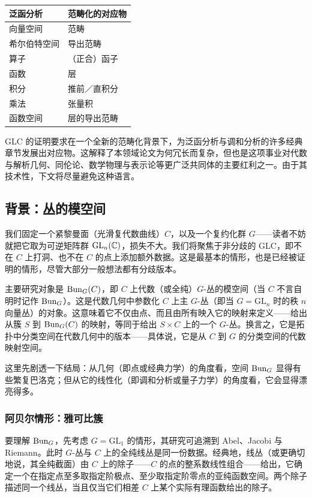 \begin{center}
\renewcommand{\arraystretch}{1.25}
\begin{tabular}{ll}
\toprule
泛函分析 & 范畴化的对应物\\
\midrule
向量空间 & 范畴\\
希尔伯特空间 & 导出范畴\\
算子 & （正合）函子\\
函数 & 层\\
积分 & 推前／直积分\\
乘法 & 张量积\\
函数空间 & 层的导出范畴\\
\bottomrule
\end{tabular}
\end{center}

GLC 的证明要求在一个全新的范畴化背景下，为泛函分析与调和分析的许多经典章节发展出对应物。这解释了本领域论文为何冗长而复杂，但也是这项事业对代数与解析几何、同伦论、数学物理与表示论等更广泛共同体的主要红利之一。由于其技术性，下文将尽量避免这种语言。

\subsection{背景：丛的模空间}\label{sec:2.2}

我们固定一个紧黎曼面（光滑复代数曲线）$C$，以及一个复约化群 $G$——读者不妨就把它取为可逆矩阵群 $\mathrm{GL}_{n}(\mathbb{C})$，损失不大。我们将聚焦于非分歧的 GLC，即不在 $C$ 上打洞、也不在 $C$ 的点上添加额外数据。这是最基本的情形，也是已经被证明的情形，尽管大部分一般想法都有分歧版本。

主要研究对象是 $\operatorname{Bun}_{G}(C)$，即 $C$ 上代数（或全纯）$G$-丛的模空间（当 $C$ 不言自明时记作 $\operatorname{Bun}_{G}$）。这是代数几何中参数化 $C$ 上主 $G$-丛（即当 $G=\mathrm{GL}_{n}$ 时的秩 $n$ 向量丛）的对象。这意味着它不仅由点、而且由所有映入它的映射来定义——给出从簇 $S$ 到 $\operatorname{Bun}_{G}(C)$ 的映射，等同于给出 $S\times C$ 上的一个 $G$-丛。换言之，它是拓扑中分类空间在代数几何中的版本——具体说，它是从 $C$ 到 $G$ 的分类空间的代数映射空间。

这里先剧透一下结局：从几何（即点或经典力学）的角度看，空间 $\operatorname{Bun}_{G}$ 显得有些繁复巴洛克；但从它的线性化（即调和分析或量子力学）的角度看，它会显得漂亮得多。

\subsubsection{阿贝尔情形：雅可比簇}\label{sec:2.2.1}

要理解 $\operatorname{Bun}_{G}$，先考虑 $G=\mathrm{GL}_{1}$ 的情形，其研究可追溯到 Abel、Jacobi 与 Riemann。此时 $G$-丛与 $C$ 上的全纯线丛是同一份数据。经典地，线丛（或更确切地说，其全纯截面）由 $C$ 上的除子——$C$ 的点的整系数线性组合——给出，它确定一个在指定点至多取指定阶极点、至少取指定阶零点的亚纯函数空间。两个除子描述同一个线丛，当且仅当它们相差 $C$ 上某个实际有理函数给出的除子。

